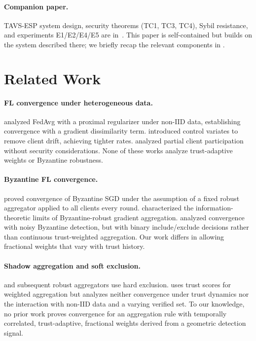 \documentclass{article}
\newcommand{\TAVESP}{\textsc{TAVS-ESP}}
\begin{document}
\paragraph{Companion paper.}
\TAVESP{} system design, security theorems (TC1, TC3, TC4), Sybil resistance,
and experiments E1/E2/E4/E5 are in~\citet{paper1}.
This paper is self-contained but builds on the system described there;
we briefly recap the relevant components in .

\section{Related Work}
\label{sec:related}

\paragraph{FL convergence under heterogeneous data.}
\citet{li2020fedprox} analyzed FedAvg with a proximal regularizer under
non-IID data, establishing convergence with a gradient dissimilarity term.
\citet{karimireddy2020scaffold} introduced control variates to remove
client drift, achieving tighter rates.
\citet{yuan2021federated} analyzed partial client participation without
security considerations.
None of these works analyze trust-adaptive weights or Byzantine robustness.

\paragraph{Byzantine FL convergence.}
\citet{karimireddy2021byzantinesgd} proved convergence of Byzantine SGD
under the assumption of a fixed robust aggregator applied to all clients
every round.
\citet{data2021byzantine} characterized the information-theoretic limits
of Byzantine-robust gradient aggregation.
\citet{wu2020federated} analyzed convergence with noisy Byzantine
detection, but with binary include/exclude decisions rather than
continuous trust-weighted aggregation.
Our work differs in allowing fractional weights that vary with trust history.

\paragraph{Shadow aggregation and soft exclusion.}
\citet{blanchard2017machine} and subsequent robust aggregators use hard
exclusion.
\citet{cao2022fltrust} uses trust scores for weighted aggregation but
analyzes neither convergence under trust dynamics nor the interaction with
non-IID data and a varying verified set.
To our knowledge, no prior work proves convergence for an aggregation rule
with temporally correlated, trust-adaptive, fractional weights derived from
a geometric detection signal.
\end{document}
